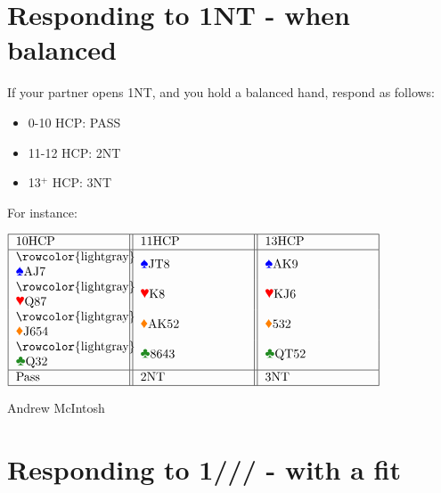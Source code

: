 \documentclass[14pt]{extarticle}
\begin{document}
\addtocounter{page}{6}

\begingroup
\centering
\section*{Responding to 1NT - when balanced}
\endgroup
\noindent If your partner opens 1NT, and you hold a balanced hand, respond as follows:
\vspace{0.07in}
\begin{itemize}
\item 0-10 HCP: PASS
\item 11-12 HCP: 2NT
\item 13$^{+}$ HCP: 3NT
\end{itemize}
\noindent For instance:

\begin{center}

$\begin{tabular}{|m{3cm}||m{3cm}||m{3cm}|}
\hline
10HCP&11HCP&13HCP\\
\hline
\rowcolor{lightgray} \textcolor{blue}{\ding{171}}AJ7 & \textcolor{blue}{\ding{171}}JT8 & \textcolor{blue}{\ding{171}}AK9\\
\rowcolor{lightgray}
\textcolor{red}{\ding{170}}Q87 &\textcolor{red}{\ding{170}}K8&\textcolor{red}{\ding{170}}KJ6\\
\rowcolor{lightgray}
\textcolor{orange}{\ding{169}}J654 &\textcolor{orange}{\ding{169}}AK52&\textcolor{orange}{\ding{169}}532\\
\rowcolor{lightgray}
\textcolor{ForestGreen}{\ding{168}}Q32 &\textcolor{ForestGreen}{\ding{168}}8643&\textcolor{ForestGreen}{\ding{168}}QT52\\
\hline
Pass& 2NT & 3NT\\
\hline
\end{tabular}
$
\end{center}

\begin{center}
 \tiny
 \textcopyright Andrew McIntosh
\end{center}



\newpage
\addtocounter{page}{2}
\vspace*{\fill}
\begingroup
\centering
\section*{Responding to 1\textcolor{ForestGreen}{}/\textcolor{orange}{}/\textcolor{red}{}/\textcolor{blue}{} - with a fit}
\endgroup
\end{document}
